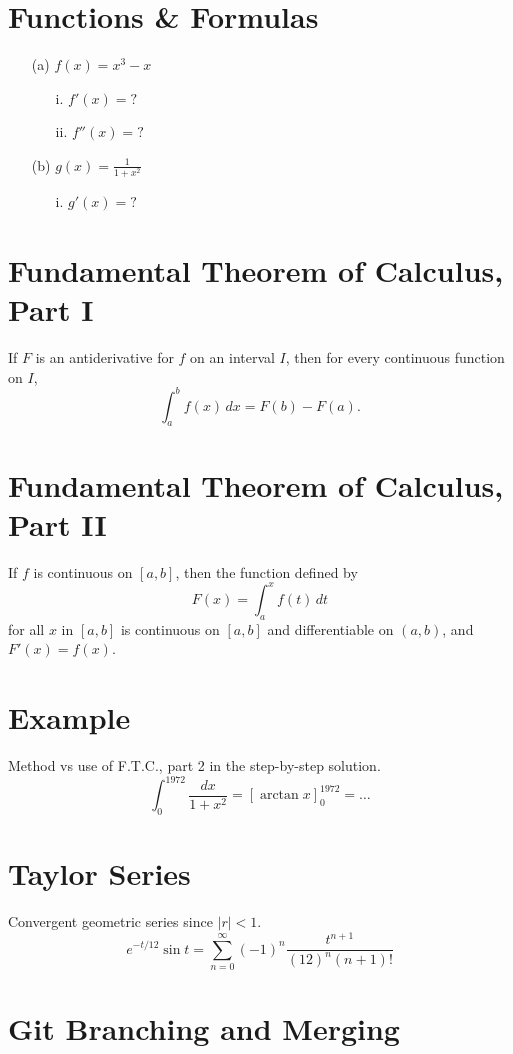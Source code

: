 \documentclass[12pt]{article}
\begin{document}
\section*{Functions \& Formulas}
\begin{enumerate}
    \item[(a)] \(f(x) = x^3 - x\)
    \begin{enumerate}
        \item[i.] \(f'(x) = ?\)
        \item[ii.] \(f''(x) = ?\)
    \end{enumerate}
    \item[(b)] \(g(x) = \frac{1}{1+x^2}\)
    \begin{enumerate}
        \item[i.] \(g'(x) = ?\)
    \end{enumerate}
\end{enumerate}

\section*{Fundamental Theorem of Calculus, Part I}
If \(F\) is an antiderivative for \(f\) on an interval \(I\), then for every continuous function on \(I\),
\[ \int_a^b f(x)\, dx = F(b) - F(a). \]

\section*{Fundamental Theorem of Calculus, Part II}
If \(f\) is continuous on \([a,b]\), then the function defined by
\[ F(x) = \int_a^x f(t)\, dt \]
for all \(x\) in \([a,b]\) is continuous on \([a,b]\) and differentiable on \((a,b)\), and \(F'(x) = f(x)\).

\section*{Example}
Method vs use of F.T.C., part 2 in the step-by-step solution.
\[ \int_0^{1972} \frac{dx}{1+x^2} = [\arctan x]_0^{1972} = \ldots \]

\section*{Taylor Series}
Convergent geometric series since \(|r| < 1\).
\[ e^{-t/12} \sin t = \sum_{n=0}^\infty (-1)^n \frac{t^{n+1}}{(12)^n (n+1)!} \]
\newpage
\section{Git Branching and Merging}
\end{document}
